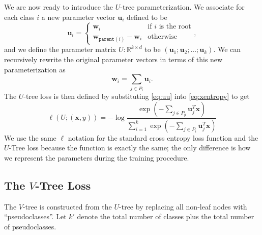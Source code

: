 \documentclass[twoside]{article}
\newcommand{\parent}[1]{\texttt{parent}({#1})}
\newcommand{\trans}[1]{{#1}^{T}}
\newcommand{\uu}{\mathbf u}
\newcommand{\w}{\mathbf w}
\newcommand{\x}{\mathbf x}
\begin{document}
We are now ready to introduce the $U$-tree parameterization.
We associate for each class $i$ a new parameter vector $\uu_i$ defined to be
\begin{equation}
    \uu_i =
    \begin{cases}
        \w_i                    & \text{if $i$ is the root} \\
        \w_{\parent{i}} - \w_i  & \text{otherwise}
    \end{cases}
    ,
\end{equation}
and we define the parameter matrix $U : \mathbb R^{k\times d}$ to be $(\uu_1;\uu_2;...;\uu_k)$.
We can recursively rewrite the original parameter vectors in terms of this new parameterization as
\begin{equation}
    \w_i = \sum_{j\in P_i} \uu_i
    .
    \label{eq:uu}
\end{equation}
The $U$-tree loss is then defined by substituting \eqref{eq:uu} into \eqref{eq:xentropy} to get
\begin{equation*}
\ell(U;(\x,y)) = - \log \frac {\exp(-\sum_{j\in P_y}\trans\uu_j \x)}{\sum_{i=1}^k \exp(- \sum_{j\in P_i}\trans\uu_j \x)}
\end{equation*}
We use the same $\ell$ notation for the standard cross entropy loss function and the $U$-Tree loss because the function is exactly the same;
the only difference is how we represent the parameters during the training procedure.

\subsection{The $V$-Tree Loss}

The $V$-tree is constructed from the $U$-tree by replacing all non-leaf nodes with ``pseudoclasses''.
Let $k'$ denote the total number of classes plus the total number of pseudoclasses.
\end{document}
